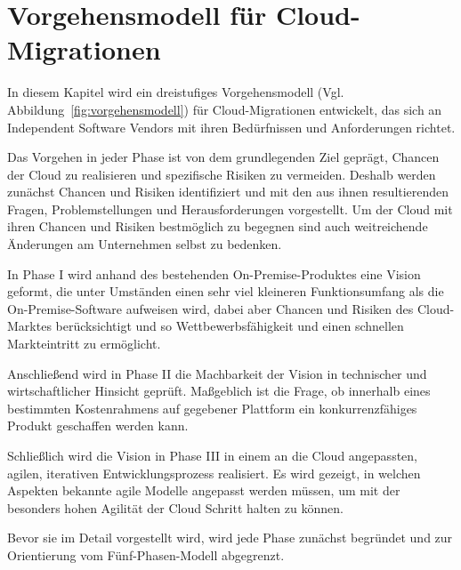 \section{Vorgehensmodell für Cloud-Migrationen}
\label{cha:entwicklung_vorgehensmodell}
In diesem Kapitel wird ein dreistufiges Vorgehensmodell (Vgl. 
Abbildung~\ref{fig:vorgehensmodell}) für Cloud-Migrationen entwickelt, das sich 
an Independent Software Vendors mit ihren Bedürfnissen und Anforderungen 
richtet.

Das Vorgehen in jeder Phase ist von dem grundlegenden Ziel geprägt, Chancen der 
Cloud zu realisieren und spezifische Risiken zu vermeiden. Deshalb werden 
zunächst Chancen und Risiken identifiziert und mit den aus ihnen resultierenden 
Fragen, Problemstellungen und Herausforderungen vorgestellt. Um der 
Cloud mit ihren Chancen und Risiken bestmöglich zu begegnen sind auch 
weitreichende Änderungen am Unternehmen selbst zu bedenken.

In Phase I wird anhand des bestehenden On-Premise-Produktes eine Vision 
geformt, die unter Umständen einen sehr viel kleineren Funktionsumfang als die 
On-Premise-Software aufweisen wird, dabei aber Chancen und Risiken des 
Cloud-Marktes berücksichtigt und so Wettbewerbsfähigkeit und einen schnellen 
Markteintritt zu ermöglicht. 

Anschließend wird in Phase II die Machbarkeit der Vision in technischer und 
wirtschaftlicher Hinsicht geprüft. Maßgeblich ist die Frage, ob innerhalb 
eines bestimmten Kostenrahmens auf gegebener
Plattform ein konkurrenzfähiges Produkt geschaffen werden kann.

Schließlich wird die Vision in Phase III in einem an die Cloud 
angepassten, agilen, iterativen Entwicklungsprozess realisiert. Es wird 
gezeigt, in welchen Aspekten bekannte agile Modelle angepasst werden müssen, um 
mit der besonders hohen Agilität der Cloud Schritt halten zu können. 

Bevor sie im Detail vorgestellt wird, wird jede Phase zunächst begründet 
und zur Orientierung vom Fünf-Phasen-Modell abgegrenzt.
\begin{comment}
Das Fünf-Phasen-Modell beginnt mit einer technischen und 
wirtschaftlichen Machbarkeitsstudie. Die Migration einer On-Premise-Software in 
die Cloud bedeutet für das migrierende Unternehmen die Erschließung eines ganz 
neuen Marktes, der sich grundlegend vom bekannten Markt unterscheidet. Aus 
diesem Grund kann das Cloud-Produkt sich grundlegend vom bisherigen 
On-Premise-Produkt unterscheiden. Deshalb wird 
\citeflow{how_saas_changes_an_isvs_business} und 
\citeflow{towards_modelling_a_cloud_applications_life_cycle} eine zusätzliche 
Phase vorgeschlagen, in der eine Vision der künftigen Cloud-Lösung entworfen 
wird. Mit dieser Vision kann der Leistungsumfang abgeschätzt werden und auch, 
wie sich das Unternehmen verändern muss, um dieser Vision zu entsprechen. 
(Kapitel~\ref{cha:phaseI})\\
\end{comment}

